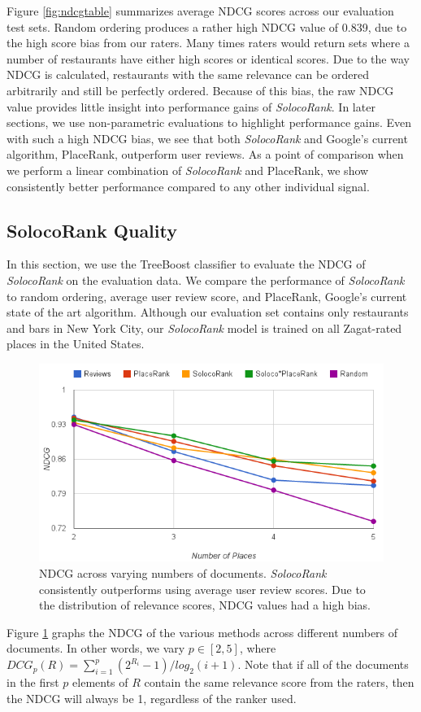 Figure \ref{fig:ndcgtable} summarizes average NDCG scores across our evaluation test sets.
Random ordering produces a rather high NDCG value of 0.839, 
due to the high score bias from our raters. 
Many times raters would return sets where a number of restaurants have either
high scores or identical scores. 
Due to the way NDCG is calculated, restaurants with the same relevance
can be ordered arbitrarily and still be perfectly ordered.
Because of this bias, the raw NDCG value provides little insight into
performance gains of \emph{SolocoRank}. In later sections, we use
non-parametric evaluations to highlight performance gains.
Even with such a high NDCG bias, we see that both \emph{SolocoRank} and
Google's current algorithm, PlaceRank, outperform user reviews.
As a point of comparison when we perform a linear combination of \emph{SolocoRank} and PlaceRank,
we show consistently better performance compared to any other individual signal.

\subsection{SolocoRank Quality}
In this section, we use the TreeBoost classifier to evaluate the NDCG
of \emph{SolocoRank} on the evaluation data.
We compare the performance of \emph{SolocoRank} to random ordering, average user review score,
and PlaceRank, Google's current state of the art algorithm.
Although our evaluation set contains only restaurants and bars in New York City,
our \emph{SolocoRank} model is trained on all Zagat-rated places in the United States.

\begin{figure}[h]
  \includegraphics[width=.5\textwidth]{fig/ndcg-vs-numdocs.png}
  \caption{NDCG across varying numbers of documents. 
  \emph{SolocoRank} consistently outperforms using average user review scores.
  Due to the distribution of relevance scores, NDCG values had a high bias.}
  \label{fig:ndcg-vs-numdocs}
\end{figure}

Figure \ref{fig:ndcg-vs-numdocs} graphs the NDCG of the various methods
across different numbers of documents.
In other words, we vary $p \in [2,5]$, where $DCG_p(R) = \sum_{i=1}^{p}(2^{R_i}-1)/log_2(i+1)$.
Note that if all of the documents in the first $p$ elements of $R$
contain the same relevance score from the raters,
then the NDCG will always be 1, regardless of the ranker used.

